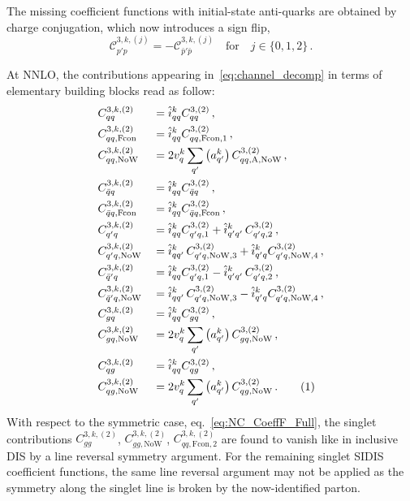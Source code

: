 \documentclass[11pt,a4paper]{article}
\newcommand{\Ccal}{\mathcal{C}}
\newcommand{\qb}{\bar{q}}
\newcommand{\qp}{{q^\prime}}
\newcommand{\qbp}{{\bar{q}^\prime}}
\newcommand{\ih}{\hat{i}}
\newcommand\numberthis{\addtocounter{equation}{1}\tag{\theequation}}
\newcommand{\NoW}{\mathrm{NoW}}
\newcommand{\Fcon}{\mathrm{Fcon}}
\newcommand{\vSa}{\mathrm{A}}
\begin{document}
The missing coefficient functions with initial-state anti-quarks are obtained by charge conjugation, which now introduces a sign flip,
\begin{equation}
\Ccal^{3,k,(j)}_{p'p} = - \Ccal^{3,k,(j)}_{\bar{p}'\bar{p}}\quad \mathrm{for} \quad  j \in \{0,1,2\} \,  .
\end{equation}

At NNLO, the contributions appearing in~\eqref{eq:channel_decomp} in terms of elementary building blocks read as follow:
\begin{alignat*}{2}
& C^{3,k,(2)}_{qq} &&= \ih_{qq}^k C^{3,(2)}_{qq}  \,  ,  \\
& C^{3,k,(2)}_{qq,\Fcon} && = \ih_{qq}^k C^{3,(2)}_{qq,\Fcon, 1} \,  , \\
& C^{3,k,(2)}_{qq,\NoW} &&= 2 v_q^k \sum_{q'} \left( a_{q'}^k \right) C^{3,(2)}_{qq,\vSa,\NoW} \,  , \\
& C^{3,k,(2)}_{\qb q} && = \ih_{qq}^k C^{3,(2)}_{\qb q}  \,  ,  \\
& C^{3,k,(2)}_{\qb q,\Fcon} && = \ih_{qq}^k C^{3,(2)}_{\qb q,\Fcon} \,  , \\
& C^{3,k,(2)}_{\qp q} && = \ih_{qq}^k C_{\qp q, 1}^{3,(2)} + \ih_{\qp\qp}^k \, C_{\qp q, 2}^{3,(2)}  \,  ,  \\
& C^{3,k,(2)}_{\qp q,\NoW} && = \ih_{q\qp}^k \, C_{\qp q, \NoW, 3}^{3,(2)} + \ih_{\qp q}^k C_{\qp q, \NoW, 4}^{3,(2)}  \,  ,  \\
& C^{3,k,(2)}_{\qbp q} && = \ih_{qq}^k C_{\qp q, 1}^{3,(2)} - \ih_{\qp\qp}^k \, C_{\qp q, 2}^{3,(2)}  \,  ,  \\
& C^{3,k,(2)}_{\qbp q,\NoW} && = \ih_{q\qp}^k \, C_{\qp q, \NoW, 3}^{3,(2)} - \ih_{\qp q}^k C_{\qp q, \NoW, 4}^{3,(2)}  \,  ,  \\
& C^{3,k,(2)}_{g q} && = \ih_{qq}^k C^{3,(2)}_{g q}  \,  , \\
& C^{3,k,(2)}_{g q,\NoW} && = 2 v_q^k \sum_{q'} \left( a_{q'}^k \right) C^{3,(2)}_{g q,\NoW}  \,  , \\
& C^{3,k,(2)}_{qg} && = \ih_{qq}^k C^{3,(2)}_{qg}  \,  , \\
& C^{3,k,(2)}_{qg,\NoW} && = 2 v_q^k \sum_{q'} \left( a_{q'}^k \right) C^{3,(2)}_{qg,\NoW}  \, . \numberthis \label{eq:NCF3_blocks}
\end{alignat*}
With respect to the symmetric case, eq.~\eqref{eq:NC_CoeffF_Full}, the singlet contributions $C^{3,k,(2)}_{gg}$, $C^{3,k,(2)}_{g g,\NoW}$, $C^{3,k,(2)}_{qq,\Fcon,2}$ are found to vanish like in inclusive DIS by a line reversal symmetry argument.
For the remaining singlet SIDIS coefficient functions, the same line reversal argument may not be applied as the symmetry along the singlet line is broken by the now-identified parton.
\end{document}
